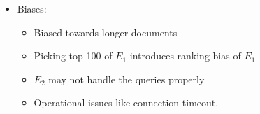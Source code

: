 \documentclass{article}
\begin{document}
\begin{enumerate}
\begin{itemize}
        \item Biases:
        \begin{itemize}
            \item Biased towards longer documents
            
            \item Picking top 100 of $E_1$ introduces ranking bias of $E_1$
            
            \item $E_2$ may not handle the queries properly
            
            \item Operational issues like connection timeout.
        \end{itemize}
    \end{itemize}
\end{enumerate}
\end{document}
